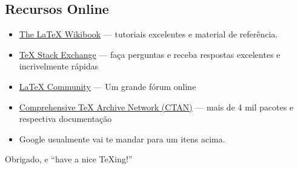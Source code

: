 \documentclass[xcolor=table]{beamer}
\begin{document}
\subsection{Recursos Online}
\begin{frame}{\insertsubsection}
	\begin{itemize}
		\item \href{http://en.wikibooks.org/wiki/LaTeX}{The \LaTeX{} Wikibook} ---
		tutoriais excelentes e material de referência.
		\item \href{http://tex.stackexchange.com/}{\TeX{} Stack Exchange} --- faça perguntas e receba respostas excelentes e incrivelmente rápidas
		\item \href{http://www.latex-community.org/}{\LaTeX{} Community} --- Um grande fórum 
		online
		\item \href{http://ctan.org/}{Comprehensive \TeX{} Archive Network (CTAN)} ---
		mais de 4 mil pacotes e respectiva documentação
		\item Google usualmente vai te mandar para um itens acima.
	\end{itemize}
\end{frame}

\begin{frame}
\begin{center}
	Obrigado, e ``have a nice \TeX{}ing!''
\end{center}
\end{frame}
\end{document}
